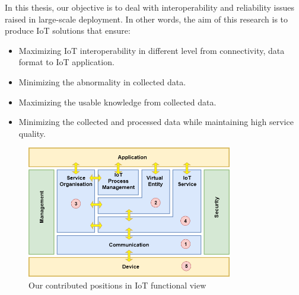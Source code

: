 \par  In this thesis, our objective is to deal with interoperability and reliability issues  raised in large-scale deployment. In other words, the aim of this research is to produce IoT solutions that ensure:
\begin{itemize}
\item Maximizing IoT interoperability in different level from connectivity, data format to IoT application.
\item Minimizing the abnormality in collected data. 
\item Maximizing the usable knowledge from collected data. 
\item Minimizing the collected and processed data while maintaining high service quality. 
\end{itemize}

\begin{figure}[h!] 
 \begin{center} 
 \includegraphics[width=0.8\textwidth]{./Introduction/Chapter1/figures/c1_IoT-A-ARM.png} 
    \caption{Our contributed positions in IoT functional view}
     \label{fig:c1_IoT-A-ARM}
  \end{center} 
\end{figure}


